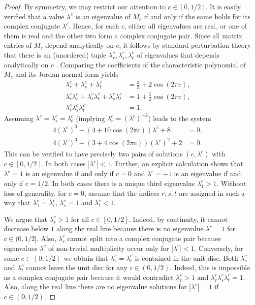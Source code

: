 \documentclass[11pt,reqno]{amsart}
\theoremstyle{plain}
\theoremstyle{definition}
\begin{document}
\begin{proof}
By symmetry, we may restrict our attention to $c \in [0,1/2]$.
It is easily verified that a value $\lambda^{c}$ is an eigenvalue of $M_{c}$ if and only if the same holds for its complex conjugate $\overline{\lambda^{c}}$. Hence, for each $c$, either all eigenvalues are real, or one of them is real and the other two form a complex conjugate pair.
Since all matrix entries of $M_{c}$ depend analytically on $c$, it follows by standard perturbation theory that there is an (unordered) tuple $\lambda_r^{c},\lambda_s^{c},\lambda_t^{c}$ of eigenvalues that depends analytically on $c$ \cite{kato}. Comparing the coefficients of the characteristic polynomial of $M_{c}$ and its Jordan normal form yields
\begin{align*}
\lambda_r^{c} + \lambda_s^{c} + \lambda_t^{c} &= \frac{3}{2} + 2 \cos(2 \pi c),
\\ \lambda_r^{c} \lambda_s^{c} + \lambda_r^{c} \lambda_t^{c} + \lambda_s^{c} \lambda_t^{c} &= 1 + \frac{5}{2} \cos(2 \pi c),
\\ \lambda_r^{c} \lambda_s^{c} \lambda_t^{c} &= 1.
\end{align*}
Assuming $\lambda^{c} = \lambda_s^{c} = \lambda_t^{c}$ (implying $\lambda_r^{c} = (\lambda^{ c})^{-2}$) leads to the system 
\begin{align*}
4 (\lambda^c)^3 - (4 + 10 \cos(2 \pi c)) \lambda^{c} + 8 &= 0,
\\ 4 (\lambda^c)^3 - (3 + 4 \cos(2 \pi c)) (\lambda^c)^2 + 2 & = 0.
\end{align*}
This can be verified to have precisely two pairs of solutions $(c,\lambda^{c})$ with $c \in [0,1/2]$. In both cases $|\lambda^{c}|<1$. 
Further, an explicit calculation shows that $\lambda^{c} = 1$ is an eigenvalue if and only if $c = 0$ and $\lambda^{c} = -1$ is an eigenvalue if and only if $c = 1/2$. In both cases there is a unique third eigenvalue $\lambda_1^{c} > 1$. 
Without loss of generality, for $c=0$, assume that the indices $r,s,t$ are assigned in such a way that $\lambda_1^{c} = \lambda_r^{c}$, $\lambda_s^{c} = 1$ and $\lambda_t^{c} < 1$.

We argue that $\lambda_r^{c}> 1$ for all $c \in [0,1/2]$. Indeed, by continuity, it cannot decrease below $1$ along the real line because there is no eigenvalue $\lambda^{c} = 1$ for $c \in (0,1/2]$. Also, $\lambda_r^{c}$ cannot split into a complex conjugate pair because eigenvalues $\lambda^{c}$ of non-trivial multiplicity occur only for $|\lambda^{c}| < 1$. 
Conversely, for some $c \in (0,1/2)$ we obtain that $\lambda_s^{c} = \lambda_t^{c}$ is contained in the unit disc. Both $\lambda_s^{c}$ and $\lambda_t^{c}$ cannot leave the unit disc for any $c \in (0,1/2)$. Indeed, this is impossible as a complex conjugate pair because it would contradict $\lambda_r^{c} > 1$ and $\lambda_r^{c} \lambda_s^{c} \lambda_t^{c} =1$. Also, along the real line there are no eigenvalue solutions for $|\lambda^{c}| = 1$ if $c \in (0,1/2)$. 
\end{proof}
\end{document}
